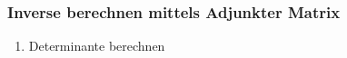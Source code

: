\subsubsection{Inverse berechnen mittels Adjunkter Matrix}
\begin{enumerate}
    \item Determinante berechnen
\end{enumerate}
